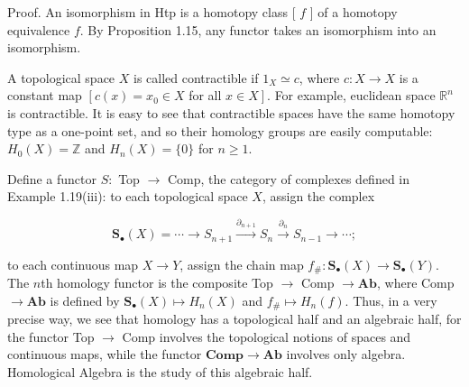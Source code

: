 \documentclass[10pt, letterpaper]{article}
\begin{document}
Proof. An isomorphism in Htp is a homotopy class [ $f$ ] of a homotopy equivalence $f$. By Proposition 1.15, any functor takes an isomorphism into an isomorphism.

A topological space $X$ is called contractible if $1_{X} \simeq c$, where $c: X \rightarrow X$ is a constant map $\left[c(x)=x_{0} \in X\right.$ for all $\left.x \in X\right]$. For example, euclidean space $\mathbb{R}^{n}$ is contractible. It is easy to see that contractible spaces have the same homotopy type as a one-point set, and so their homology groups are easily computable: $H_{0}(X)=\mathbb{Z}$ and $H_{n}(X)=\{0\}$ for $n \geq 1$.

Define a functor $S:$ Top $\rightarrow$ Comp, the category of complexes defined in Example 1.19(iii): to each topological space $X$, assign the complex

$$
\mathbf{S}_{\bullet}(X)=\cdots \rightarrow S_{n+1} \xrightarrow{\partial_{n+1}} S_{n} \xrightarrow{\partial_{n}} S_{n-1} \rightarrow \cdots ;
$$

to each continuous map $X \rightarrow Y$, assign the chain map $f_{\#}: \mathbf{S}_{\bullet}(X) \rightarrow \mathbf{S}_{\bullet}(Y)$. The $n$th homology functor is the composite Top $\rightarrow$ Comp $\rightarrow \mathbf{A b}$, where Comp $\rightarrow \mathbf{A b}$ is defined by $\mathbf{S}_{\bullet}(X) \mapsto H_{n}(X)$ and $f_{\#} \mapsto H_{n}(f)$. Thus, in a very precise way, we see that homology has a topological half and an algebraic half, for the functor Top $\rightarrow$ Comp involves the topological notions of spaces and continuous maps, while the functor $\mathbf{C o m p} \rightarrow \mathbf{A b}$ involves only algebra. Homological Algebra is the study of this algebraic half.
\end{document}
